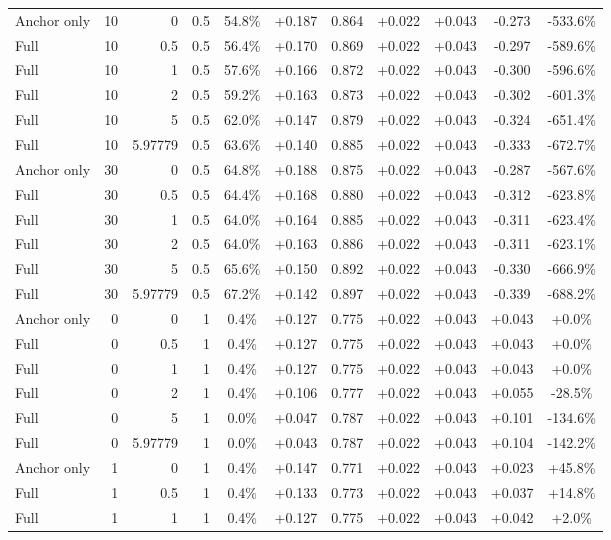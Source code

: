 \begin{table}[htbp]
\begin{tabular}{lrrrccccccc}
Anchor only & 10 & 0 & 0.5 & 54.8\% & +0.187 & 0.864 & +0.022 & +0.043 & -0.273 & -533.6\% \\
Full & 10 & 0.5 & 0.5 & 56.4\% & +0.170 & 0.869 & +0.022 & +0.043 & -0.297 & -589.6\% \\
Full & 10 & 1 & 0.5 & 57.6\% & +0.166 & 0.872 & +0.022 & +0.043 & -0.300 & -596.6\% \\
Full & 10 & 2 & 0.5 & 59.2\% & +0.163 & 0.873 & +0.022 & +0.043 & -0.302 & -601.3\% \\
Full & 10 & 5 & 0.5 & 62.0\% & +0.147 & 0.879 & +0.022 & +0.043 & -0.324 & -651.4\% \\
Full & 10 & 5.97779 & 0.5 & 63.6\% & +0.140 & 0.885 & +0.022 & +0.043 & -0.333 & -672.7\% \\
Anchor only & 30 & 0 & 0.5 & 64.8\% & +0.188 & 0.875 & +0.022 & +0.043 & -0.287 & -567.6\% \\
Full & 30 & 0.5 & 0.5 & 64.4\% & +0.168 & 0.880 & +0.022 & +0.043 & -0.312 & -623.8\% \\
Full & 30 & 1 & 0.5 & 64.0\% & +0.164 & 0.885 & +0.022 & +0.043 & -0.311 & -623.4\% \\
Full & 30 & 2 & 0.5 & 64.0\% & +0.163 & 0.886 & +0.022 & +0.043 & -0.311 & -623.1\% \\
Full & 30 & 5 & 0.5 & 65.6\% & +0.150 & 0.892 & +0.022 & +0.043 & -0.330 & -666.9\% \\
Full & 30 & 5.97779 & 0.5 & 67.2\% & +0.142 & 0.897 & +0.022 & +0.043 & -0.339 & -688.2\% \\
Anchor only & 0 & 0 & 1 & 0.4\% & +0.127 & 0.775 & +0.022 & +0.043 & +0.043 & +0.0\% \\
Full & 0 & 0.5 & 1 & 0.4\% & +0.127 & 0.775 & +0.022 & +0.043 & +0.043 & +0.0\% \\
Full & 0 & 1 & 1 & 0.4\% & +0.127 & 0.775 & +0.022 & +0.043 & +0.043 & +0.0\% \\
Full & 0 & 2 & 1 & 0.4\% & +0.106 & 0.777 & +0.022 & +0.043 & +0.055 & -28.5\% \\
Full & 0 & 5 & 1 & 0.0\% & +0.047 & 0.787 & +0.022 & +0.043 & +0.101 & -134.6\% \\
Full & 0 & 5.97779 & 1 & 0.0\% & +0.043 & 0.787 & +0.022 & +0.043 & +0.104 & -142.2\% \\
Anchor only & 1 & 0 & 1 & 0.4\% & +0.147 & 0.771 & +0.022 & +0.043 & +0.023 & +45.8\% \\
Full & 1 & 0.5 & 1 & 0.4\% & +0.133 & 0.773 & +0.022 & +0.043 & +0.037 & +14.8\% \\
Full & 1 & 1 & 1 & 0.4\% & +0.127 & 0.775 & +0.022 & +0.043 & +0.042 & +2.0\% \\

\end{tabular}
\end{table}
